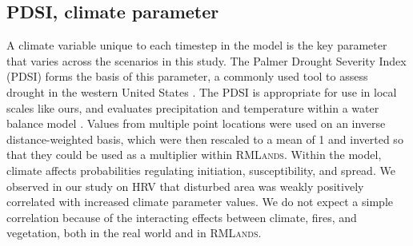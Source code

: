 \documentclass[12pt]{article}
\begin{document}
\begin{spacing}{1}

\subsection*{PDSI, climate parameter}
A climate variable unique to each timestep in the model is the key parameter that varies across the scenarios in this study. The Palmer Drought Severity Index (PDSI) forms the basis of this parameter, a commonly used tool to assess drought in the western United States \citep{Cook2004}. The PDSI is appropriate for use in local scales like ours, and evaluates precipitation and temperature within a water balance model \citep{HeimJr2002}. Values from multiple point locations were used on an inverse distance-weighted basis, which were then rescaled to a mean of 1 and inverted so that they could be used as a multiplier within \textsc{RMLands}. Within the model, climate affects probabilities regulating initiation, susceptibility, and spread. We observed in our study on HRV that disturbed area was weakly positively correlated with increased climate parameter values. We do not expect a simple correlation because of the interacting effects between climate, fires, and vegetation, both in the real world and in \textsc{RMLands}. %


\end{spacing}
\end{document}
